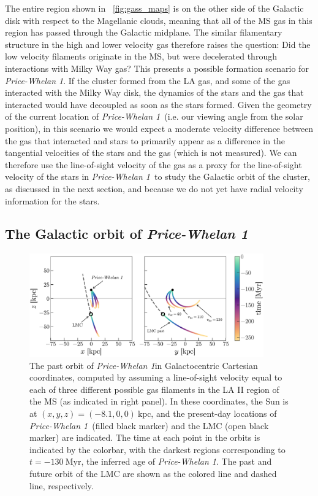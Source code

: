 \documentclass[twocolumn]{aastex62}
\newcommand{\kpc}{\textrm{kpc}}
\newcommand{\clustername}{\textsl{Price-Whelan 1}}
\begin{document}
The entire region shown in \figurename~\ref{fig:gass_maps} is on the other side of the Galactic disk with respect to the Magellanic clouds, meaning that all of the MS gas in this region has passed through the Galactic midplane.
The similar filamentary structure in the high and lower velocity gas therefore raises the question: Did the low velocity filaments originate in the MS, but were decelerated through interactions with Milky Way gas?
This presents a possible formation scenario for \clustername.
If the cluster formed from the LA gas, and some of the gas interacted with the Milky Way disk, the dynamics of the stars and the gas that interacted would have decoupled as soon as the stars formed.
Given the geometry of the current location of \clustername\ (i.e. our viewing angle from the solar position), in this scenario we would expect a moderate velocity difference between the gas that interacted and stars to primarily appear as a difference in the tangential velocities of the stars and the gas (which is not measured).
We can therefore use the line-of-sight velocity of the gas as a proxy for the line-of-sight velocity of the stars in \clustername\ to study the Galactic orbit of the cluster, as discussed in the next section, and because we do not yet have radial velocity information for the stars.


\subsection{The Galactic orbit of \clustername}
\label{sec:orbit}

\begin{figure}[ht!]
\centering
\includegraphics[width=0.9\textwidth]{figures/orbits.pdf}
\caption{The past orbit of \clustername in Galactocentric Cartesian coordinates, computed by assuming a line-of-sight velocity equal to each of three different possible gas  filaments in the LA II region of the MS (as indicated in right panel).
In these coordinates, the Sun is at $(x, y, z) = (-8.1, 0, 0)~\kpc$, and the present-day locations of \clustername\ (filled black marker) and the LMC (open black marker) are indicated.
The time at each point in the orbits is indicated by the colorbar, with the darkest regions corresponding to $t = -130~\textrm{Myr}$, the inferred age of \clustername.
The past and future orbit of the LMC are shown as the colored line and dashed line, respectively.
}
\label{fig:orbits}
\end{figure}
\end{document}
